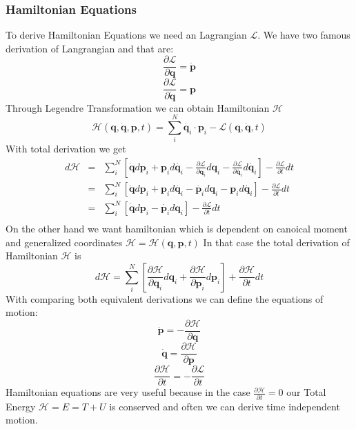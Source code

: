 \subsubsection{Hamiltonian Equations}
To derive Hamiltonian Equations we need an Lagrangian $\mathcal{L}$.
We have two famous derivation of Langrangian and that are:
\begin{equation}
	\frac{\partial\mathcal{L}}{\partial \mathbf{q}} = \dot{\mathbf{p}}
\end{equation}
\begin{equation}
	\frac{\partial\mathcal{L}}{\partial \dot{\mathbf{q}}} = \mathbf{p}
\end{equation}
Through Legendre Transformation we can obtain Hamiltonian $\mathcal{H}$
\begin{equation}
	\mathcal{H}(\mathbf{q},\dot{\mathbf{q}},\mathbf{p},t) = \sum_i^N  \dot{\mathbf{q}_i} \cdot \mathbf{p}_i -\mathcal{L}(\mathbf{q},\dot{\mathbf{q}},t)
\end{equation}
With total derivation\cite{ham} we get
\begin{eqnarray}
	d\mathcal{H} &=& \sum_i^N\left[ \dot{\mathbf{q}} d\mathbf{p}_i +  \mathbf{p}_i d\dot{\mathbf{q}_i} - \frac{\partial\mathcal{L}}{\partial \mathbf{q}_i} d\mathbf{q}_i - \frac{\partial\mathcal{L}}{\partial \dot{\mathbf{q}_i}} d\dot{\mathbf{q}_i}\right] - \frac{\partial\mathcal{L}}{\partial t} dt\\ 
	&=& \sum_i^N\left[ \dot{\mathbf{q}} d\mathbf{p}_i +  \mathbf{p}_i d\dot{\mathbf{q}_i} - \dot{\mathbf{p}_i} d\mathbf{q}_i - \mathbf{p}_i d\dot{\mathbf{q}_i}\right] - \frac{\partial\mathcal{L}}{\partial t} dt\\
	&=&\sum_i^N\left[ \dot{\mathbf{q}} d\mathbf{p}_i  - \dot{\mathbf{p}_i} d\mathbf{q}_i\right] - \frac{\partial\mathcal{L}}{\partial t} dt\\
\end{eqnarray}
On the other hand we want hamiltonian which is dependent on canoical moment and generalized coordinates $\mathcal{H}=\mathcal{H}(\mathbf{q},\mathbf{p},t)$
In that case the total derivation of Hamiltonian $\mathcal{H}$ is
\begin{equation}
	d\mathcal{H} = \sum_i^N\left[\frac{\partial \mathcal{H}}{\partial \mathbf{q}_i}d\mathbf{q}_i + \frac{\partial \mathcal{H}}{\partial \mathbf{p}_i}d\mathbf{p}_i\right] + \frac{\partial\mathcal{H}}{\partial t} dt
\end{equation}
With comparing both equivalent derivations we can define the equations of motion:
\begin{equation}
	\dot{\mathbf{p}} = -\frac{\partial \mathcal{H}}{\partial \mathbf{q}}
\end{equation}
\begin{equation}
	\dot{\mathbf{q}} = \frac{\partial \mathcal{H}}{\partial \mathbf{p}}
\end{equation}
\begin{equation}
	\frac{\partial\mathcal{H}}{\partial t} = - \frac{\partial\mathcal{L}}{\partial t}
\end{equation}
Hamiltonian equations are very useful because in the case $\frac{\partial\mathcal{H}}{\partial t} = 0$ our Total Energy $\mathcal{H} = E = T + U$ is conserved and often we can derive time independent motion.
